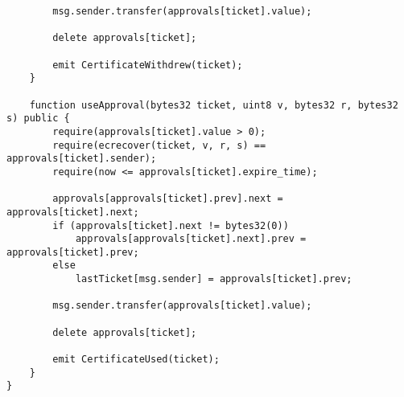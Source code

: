 \begin{verbatim}
        msg.sender.transfer(approvals[ticket].value);

        delete approvals[ticket];

        emit CertificateWithdrew(ticket);
    }

    function useApproval(bytes32 ticket, uint8 v, bytes32 r, bytes32 s) public {
        require(approvals[ticket].value > 0);
        require(ecrecover(ticket, v, r, s) == approvals[ticket].sender);
        require(now <= approvals[ticket].expire_time);

        approvals[approvals[ticket].prev].next = approvals[ticket].next;
        if (approvals[ticket].next != bytes32(0))
            approvals[approvals[ticket].next].prev = approvals[ticket].prev;
        else
            lastTicket[msg.sender] = approvals[ticket].prev;

        msg.sender.transfer(approvals[ticket].value);

        delete approvals[ticket];

        emit CertificateUsed(ticket);
    }
}
\end{verbatim}

